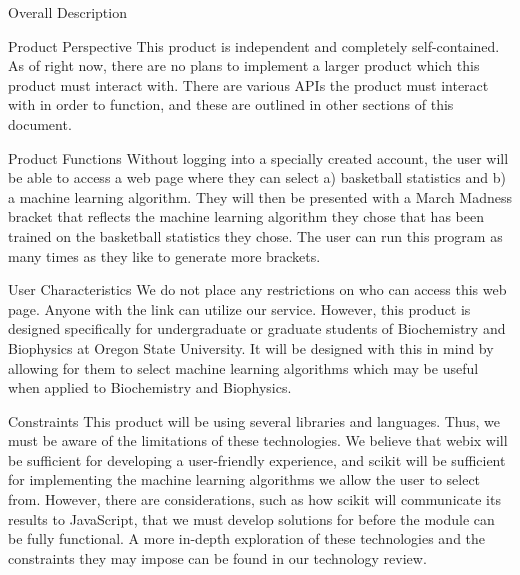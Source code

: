\documentclass[letterpaper, 10pt,titlepage]{article}
\begin{document}
\newpage
\begin{section}{Overall Description}


\begin{subsection}{Product Perspective}
This product is independent and completely self-contained. As of right now, there are no plans to implement a larger product which this product must interact with. There are various APIs the product must interact with in order to function, and these are outlined in other sections of this document.
\end{subsection}

\begin{subsection}{Product Functions}
Without logging into a specially created account, the user will be able to access a web page where they can select a) basketball statistics and b) a machine learning algorithm. They will then be presented with a March Madness bracket that reflects the machine learning algorithm they chose that has been trained on the basketball statistics they chose. The user can run this program as many times as they like to generate more brackets. 
\end{subsection}

\begin{subsection}{User Characteristics}
We do not place any restrictions on who can access this web page. Anyone with the link can utilize our service. However, this product is designed specifically for undergraduate or graduate students of Biochemistry and Biophysics at Oregon State University. It will be designed with this in mind by allowing for them to select machine learning algorithms which may be useful when applied to Biochemistry and Biophysics. 
\end{subsection}

\begin{subsection}{Constraints}
This product will be using several libraries and languages. Thus, we must be aware of the limitations of these technologies. We believe that webix will be sufficient for developing a user-friendly experience, and scikit will be sufficient for implementing the machine learning algorithms we allow the user to select from. However, there are considerations, such as how scikit will communicate its results to JavaScript, that we must develop solutions for before the module can be fully functional. A more in-depth exploration of these technologies and the constraints they may impose can be found in our technology review. 
\end{subsection}


\end{section}
\end{document}

